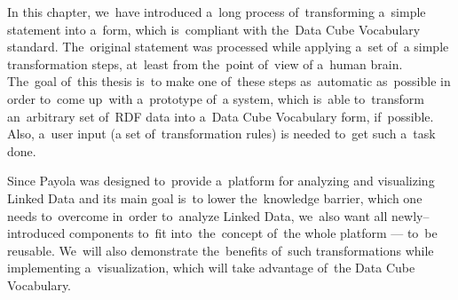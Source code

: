 In this chapter, we~have introduced a~long process of~transforming a~simple statement into
a~form, which is~compliant with the~Data Cube Vocabulary standard. The~original statement
was processed while applying a~set of~a simple transformation steps, at~least from the~point of~view
of a~human brain. The~goal of~this thesis is~to make one of~these steps as~automatic as~possible 
in order to~come up~with a~prototype of~a system, which is~able to~transform an~arbitrary set of~RDF data
into a~Data Cube Vocabulary form, if~possible. Also, a~user input (a set of~transformation rules) is
needed to~get such a~task done. 

Since Payola was designed to~provide a~platform for analyzing and visualizing 
Linked Data and its main goal is~to lower the~knowledge barrier, which one needs to~overcome in~order to~analyze Linked Data, we~also want all newly--introduced 
components to~fit into~the~concept of~the whole platform --- to~be reusable. We~will also demonstrate the~benefits of~such transformations while implementing 
a~visualization, which will take advantage of~the Data Cube Vocabulary.